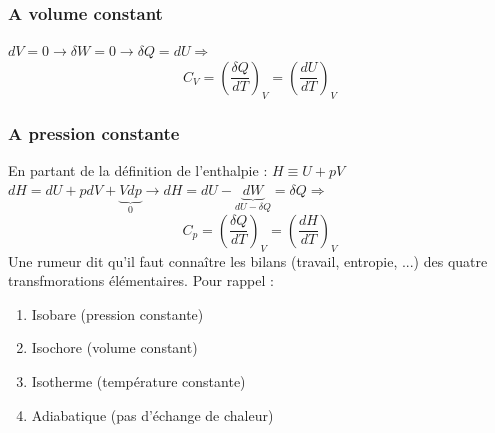 \documentclass[11pt, a4paper, openany]{book}
\begin{document}
		\subsubsection*{A volume constant}
		$dV = 0\rightarrow \delta W = 0 \rightarrow \delta Q = dU \Rightarrow$
		\begin{equation}
			C_V = \left(\frac{\delta Q}{dT}\right)_V = \left(\frac{dU}{dT}\right)_V
		\end{equation}
		
		\subsubsection*{A pression constante}
		En partant de la définition de l'enthalpie : $H \equiv U + pV$\\
		$dH = dU + pdV + \underbrace{Vdp}_0 \rightarrow dH =  dU - \underbrace{dW}_{dU-\delta Q} = \delta Q \Rightarrow$
		\begin{equation}
			C_p = \left(\frac{\delta Q}{dT}\right)_V = \left(\frac{dH}{dT}\right)_V
		\end{equation}
		Une rumeur dit qu'il faut connaître les bilans (travail, entropie, ...) des quatre transfmorations élémentaires. Pour rappel :
		\begin{enumerate}
			\item Isobare (pression constante)
			\item Isochore (volume constant)
			\item Isotherme (température constante)
			\item Adiabatique (pas d'échange de chaleur)
		\end{enumerate}
		
\end{document}
